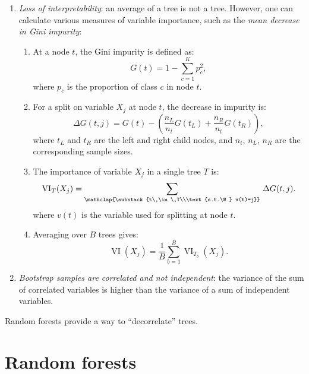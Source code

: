 \begin{enumerate}
    \item \emph{Loss of interpretability}: an average of a tree is not a tree. However, one can calculate various measures of variable importance, such as the \emph{mean decrease in Gini impurity}:
    \begin{enumerate}
        \item At a node $t$, the Gini impurity is defined as:
        \begin{equation}
            G(t) = 1 - \sum_{c=1}^{K} p_{c}^{2},
        \end{equation}
        where $p_c$ is the proportion of class $c$ in node $t$.

        \item For a split on variable $X_j$ at node $t$, the decrease in impurity is:
        \begin{equation}
            \Delta G(t, j) = G(t) - \left( \frac{n_L}{n_t} G(t_L) + \frac{n_R}{n_t} G(t_R) \right),
        \end{equation}
        where $t_L$ and $t_R$ are the left and right child nodes, and $n_t$, $n_L$, $n_R$ are the corresponding sample sizes.

        \item The importance of variable $X_j$ in a single tree $T$ is:
        \begin{equation}
            \operatorname{VI}_T(X_j) = \sum_{\mathclap{\substack{t\,\in\,T\\\text{s.t.\@ } v(t)=j}}}\,\Delta G(t, j).
        \end{equation}
        where $v(t)$ is the variable used for splitting at node $t$.

        \item Averaging over $B$ trees gives:
        \begin{equation}
            \operatorname{VI}(X_j) = \frac{1}{B} \sum_{b=1}^{B} \operatorname{VI}_{T_b}(X_j).
        \end{equation}
    \end{enumerate}
    \item \emph{Bootstrap samples are correlated and not independent}: the variance of the sum of correlated variables is higher than the variance of a sum of independent variables. 
\end{enumerate}

Random forests provide a way to ``decorrelate'' trees.

\section{Random forests}


